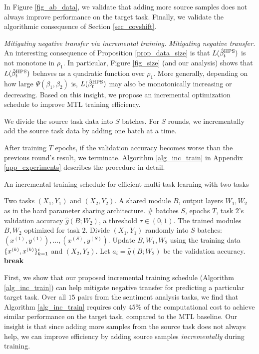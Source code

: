 In Figure \ref{fig_ab_data}, we validate that adding more source samples does not always improve performance on the target task.
Finally, we validate the algorithmic consequence of Section \ref{sec_covshift}.

\textit{Mitigating negative transfer via incremental training.}
\noindent\textit{Mitigating negative transfer.}
An interesting consequence of Proposition \ref{prop_data_size} is that $L(\hat{\beta}_t^{\textup{HPS}})$ is not monotone in $\rho_1$.
In particular, Figure \ref{fig_size} (and our analysis) shows that $L(\hat{\beta}_t^{\textup{HPS}})$ behaves as a quadratic function over $\rho_1$.
More generally, depending on how large $\Psi(\beta_1, \beta_2)$ is, $L(\hat{\beta}_t^{\textup{HPS}})$ may also be monotonically increasing or decreasing.
Based on this insight, we propose an incremental optimization schedule to improve MTL training efficiency.
\squishlist
	\item We divide the source task data into $S$ batches.
	For $S$ rounds, we incrementally add the source task data by adding one batch at a time.
	\item After training $T$ epochs, if the validation accuracy becomes worse than the previous round's result, we terminate.
	Algorithm \ref{alg_inc_train} in Appendix \ref{app_experiments} describes the procedure in detail.
\squishend

\begin{algorithm}[!t]
	\caption{An incremental training schedule for efficient multi-task learning with two tasks}
	\label{alg_inc_train}
	\begin{algorithmic}[1]
		\Input Two tasks $(X_1, Y_1)$ and $(X_2, Y_2)$.
		\Param A shared module $B$, output layers $W_1, W_2$ as in the hard parameter sharing architecture.
		\Req \# batches $S$, epochs $T$, task $2$'s validation accuracy $\hat{g}(B; W_2)$, a threshold $\tau\in(0,1)$.
		\Output The trained modules $B, W_2$ optimized for task $2$.
		\State Divide $(X_1, Y_1)$ randomly into $S$ batches: $(x^{(1)}, y^{(1)}), \dots, (x^{(S)}, y^{(S)})$.
				\State Update $B, W_1, W_2$ using the training data $\{x^{(k)}, x^{(k)}\}_{k=1}^i$ and  $(X_2, Y_2)$.
			\EndFor
			\State Let $a_i = \hat{g}(B; W_2)$ be the validation accuracy.
				\State \textbf{break}
			\EndIf
		\EndFor
	\end{algorithmic}
\end{algorithm}


First, we show that our proposed incremental training schedule (Algorithm \ref{alg_inc_train}) can help mitigate negative transfer for predicting a particular target task.
Over all $15$ pairs from the sentiment analysis tasks, we find that Algorithm \ref{alg_inc_train} requires only $45\%$ of the computational cost to achieve similar performance on the target task, compared to the MTL baseline.
Our insight is that since adding more samples from the source task does not always help, we can improve efficiency by adding source samples \textit{incrementally} during training.

